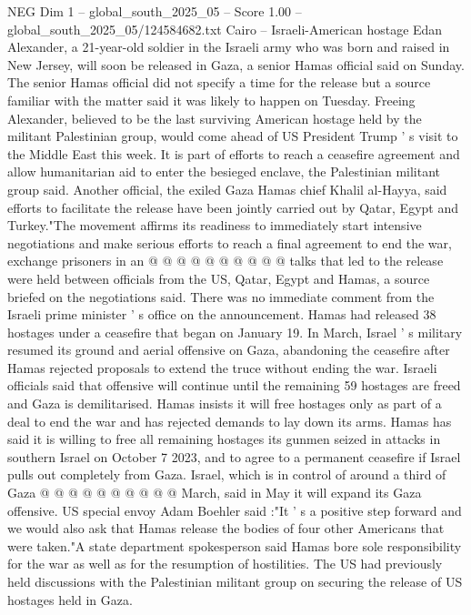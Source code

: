\begin{textsample}{NEG Dim 1 – global\_south\_2025\_05 – Score 1.00 – global\_south\_2025\_05/124584682.txt}  \label{ex:f1_neg_175}
Cairo -- Israeli-American hostage Edan Alexander, a 21-year-old soldier in the Israeli army who was born and raised in New Jersey, will soon be released in Gaza, a senior Hamas official said on Sunday.
The senior Hamas official did not specify a time for the release but a source familiar with the matter said it was likely to happen on Tuesday.
Freeing Alexander, believed to be the last surviving American hostage held by the militant Palestinian group, would come ahead of US President Trump ' s visit to the Middle East this week.
It is part of efforts to reach a ceasefire agreement and allow humanitarian aid to enter the besieged enclave, the Palestinian militant group said.
Another official, the exiled Gaza Hamas chief Khalil al-Hayya, said efforts to facilitate the release have been jointly carried out by Qatar, Egypt and Turkey."The movement affirms its readiness to immediately start intensive negotiations and make serious efforts to reach a final agreement to end the war, exchange prisoners in an @ @ @ @ @ @ @ @ @ @ talks that led to the release were held between officials from the US, Qatar, Egypt and Hamas, a source briefed on the negotiations said.
There was no immediate comment from the Israeli prime minister ' s office on the announcement.
Hamas had released 38 hostages under a ceasefire that began on January 19.
In March, Israel ' s military resumed its ground and aerial offensive on Gaza, abandoning the ceasefire after Hamas rejected proposals to extend the truce without ending the war.
Israeli officials said that offensive will continue until the remaining 59 hostages are freed and Gaza is demilitarised.
Hamas insists it will free hostages only as part of a deal to end the war and has rejected demands to lay down its arms.
Hamas has said it is willing to free all remaining hostages its gunmen seized in attacks in southern Israel on October 7 2023, and to agree to a permanent ceasefire if Israel pulls out completely from Gaza.
Israel, which is in control of around a third of Gaza @ @ @ @ @ @ @ @ @ @ March, said in May it will expand its Gaza offensive.
US special envoy Adam Boehler said :"It ' s a positive step forward and we would also ask that Hamas release the bodies of four other Americans that were taken."A state department spokesperson said Hamas bore sole responsibility for the war as well as for the resumption of hostilities.
The US had previously held discussions with the Palestinian militant group on securing the release of US hostages held in Gaza.

\end{textsample}
